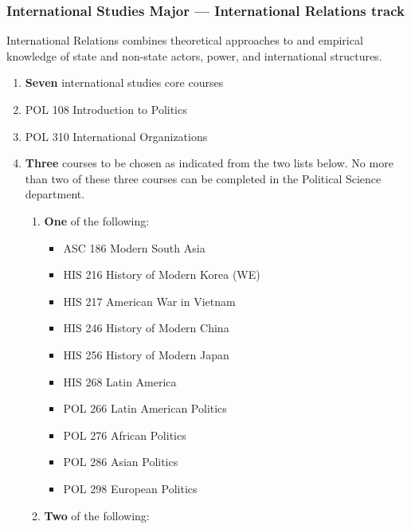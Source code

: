 \documentclass[
  letterpaper,
]{scrbook}
\providecommand{\tightlist}{%
  \setlength{\itemsep}{0pt}\setlength{\parskip}{0pt}}
\begin{document}
\subsubsection{International Studies Major --- International Relations
track}\label{international-studies-major-international-relations-track}

International Relations combines theoretical approaches to and empirical
knowledge of state and non-state actors, power, and international
structures.

\begin{enumerate}
\def\labelenumi{\arabic{enumi}.}
\tightlist
\item
  \textbf{Seven} international studies core courses\\
\item
  POL 108 Introduction to Politics\\
\item
  POL 310 International Organizations\\
\item
  \textbf{Three} courses to be chosen as indicated from the two lists
  below. No more than two of these three courses can be completed in the
  Political Science department.

  \begin{enumerate}
  \def\labelenumii{\alph{enumii}.}
  \tightlist
  \item
    \textbf{One} of the following:

    \begin{itemize}
    \tightlist
    \item
      ASC 186 Modern South Asia\\
    \item
      HIS 216 History of Modern Korea (WE)\\
    \item
      HIS 217 American War in Vietnam\\
    \item
      HIS 246 History of Modern China\\
    \item
      HIS 256 History of Modern Japan\\
    \item
      HIS 268 Latin America\\
    \item
      POL 266 Latin American Politics\\
    \item
      POL 276 African Politics\\
    \item
      POL 286 Asian Politics\\
    \item
      POL 298 European Politics\\
    \end{itemize}
  \item
    \textbf{Two} of the following:


\end{enumerate}
\end{enumerate}
\end{document}
